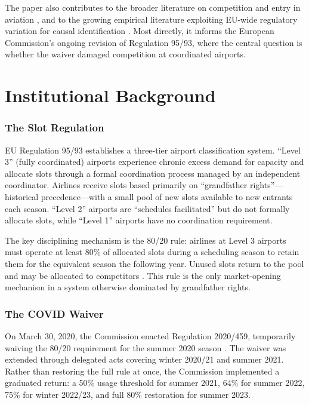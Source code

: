 \documentclass[12pt]{article}
\begin{document}
The paper also contributes to the broader literature on competition and entry in aviation \citep{borenstein1989, borenstein1992, berry1992, morrison2001, ciliberto2021}, and to the growing empirical literature exploiting EU-wide regulatory variation for causal identification \citep{dechezlepretre2023}. Most directly, it informs the European Commission's ongoing revision of Regulation 95/93, where the central question is whether the waiver damaged competition at coordinated airports.

\section{Institutional Background}

\subsubsection*{The Slot Regulation} EU Regulation 95/93 establishes a three-tier airport classification system. ``Level 3'' (fully coordinated) airports experience chronic excess demand for capacity and allocate slots through a formal coordination process managed by an independent coordinator. Airlines receive slots based primarily on ``grandfather rights''---historical precedence---with a small pool of new slots available to new entrants each season. ``Level 2'' airports are ``schedules facilitated'' but do not formally allocate slots, while ``Level 1'' airports have no coordination requirement.

The key disciplining mechanism is the 80/20 rule: airlines at Level 3 airports must operate at least 80\% of allocated slots during a scheduling season to retain them for the equivalent season the following year. Unused slots return to the pool and may be allocated to competitors \citep{iata2021slots, gillen2006}. This rule is the only market-opening mechanism in a system otherwise dominated by grandfather rights.

\subsubsection*{The COVID Waiver} On March 30, 2020, the Commission enacted Regulation 2020/459, temporarily waiving the 80/20 requirement for the summer 2020 season \citep{ec2020waiver}. The waiver was extended through delegated acts covering winter 2020/21 and summer 2021. Rather than restoring the full rule at once, the Commission implemented a graduated return: a 50\% usage threshold for summer 2021, 64\% for summer 2022, 75\% for winter 2022/23, and full 80\% restoration for summer 2023.
\end{document}
